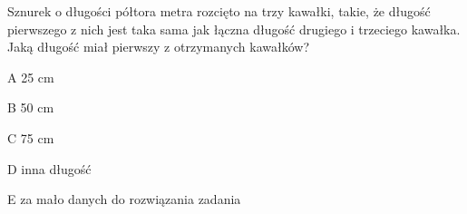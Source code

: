 \begin{tresc}
Sznurek o długości półtora metra rozcięto na trzy kawałki, takie, że długość pierwszego z nich jest taka sama jak łączna długość drugiego i trzeciego kawałka. Jaką długość miał pierwszy z otrzymanych kawałków?
\end{tresc}
\begin{wariant}{A} 25 cm \end{wariant}
\begin{wariant}{B} 50 cm \end{wariant}
\begin{wariant}{C} 75 cm \end{wariant}
\begin{wariant}{D} inna długość \end{wariant}
\begin{wariant}{E} za mało danych do rozwiązania zadania \end{wariant}
